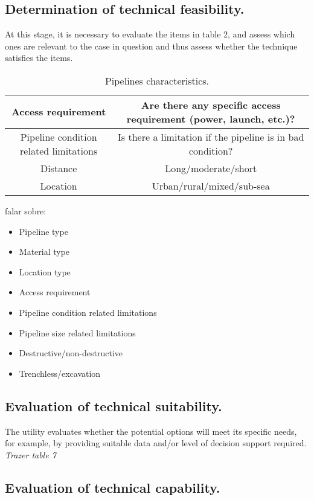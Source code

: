 \documentclass[
	article,			%
	12pt,				%
	oneside,			%
	a4paper,			%
	english,			%
	brazil,				%
	sumario=tradicional
	]{abntex2}
\begin{document}
\subsection{\textbf{Determination of technical feasibility.}}

At this stage, it is necessary to evaluate the items in table 2, and assess which ones are relevant to the case in question and thus assess whether the technique satisfies the items.\\

\begin{table}[h!]
\label{tab:feasi}
\centering		
\caption{Pipelines characteristics\cite{lu}.}
\begin{tabular}{|c|c|}
\hline
Access requirement & Are there any specific access requirement (power, launch, etc.)? \\ \hline
Pipeline condition related limitations & Is there a limitation if the pipeline is in bad condition?  \\ \hline
Distance & Long/moderate/short  \\ \hline
Location & Urban/rural/mixed/sub-sea  \\ \hline
\end{tabular}
\end{table}


falar sobre:
\begin{itemize}
    \item Pipeline type
    \item Material type
    \item Location type
    \item Access requirement
    \item Pipeline condition related limitations
    \item Pipeline size related limitations
    \item Destructive/non-destructive
    \item Trenchless/excavation
\end{itemize}

\subsection{\textbf{Evaluation of technical suitability.}}
The utility evaluates whether the potential options will meet its specific needs, for example, by providing suitable data and/or level of decision support required.
\emph{Trazer table 7}
\subsection{\textbf{Evaluation of technical capability.}}
\end{document}
